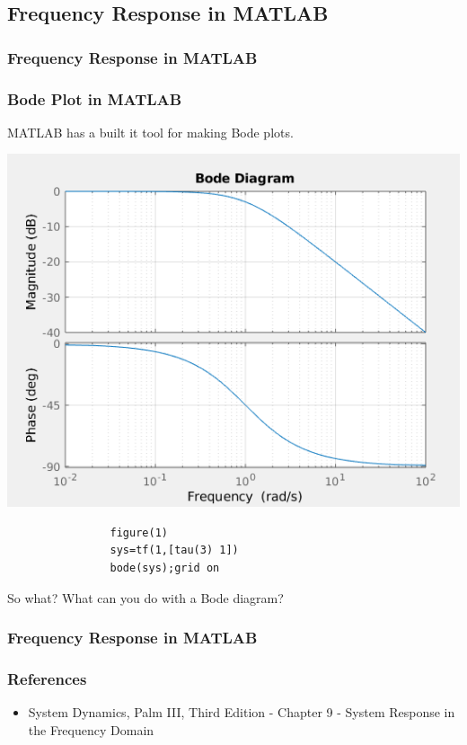 \documentclass[fleqn]{beamer} %
\newcommand{\sectionIIsubsectionIVtitle}{Frequency Response in MATLAB}
\begin{document}
			
		\subsection{\sectionIIsubsectionIVtitle}\label{sectionIIsubsectionIV}

			\begin{frame}[containsverbatim]
				\frametitle{\sectionIIsubsectionIVtitle}
				\bigskip

				\frametitle{Bode Plot in MATLAB}

				MATLAB has a built it tool for making Bode plots.  
				\begin{multicols}{2}
				\includegraphics[scale=.25]{images/lecture2_fig9.png}

				\begin{lstlisting}
				figure(1)
				sys=tf(1,[tau(3) 1])
				bode(sys);grid on
				\end{lstlisting}

				\end{multicols}

				So what? What can you do with a Bode diagram?
								
				\btVFill 
			\end{frame}	

			\begin{frame}
				\frametitle{\sectionIIsubsectionIVtitle}
				\bigskip

				\frametitle{References}

				\begin{itemize}
					\item System Dynamics, Palm III, Third Edition - Chapter 9 - System Response in the Frequency Domain
				\end{itemize}
				

				\btVFill 
			\end{frame}	
		
\end{document}
